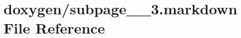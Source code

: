 \hypertarget{subpage__1__3_8markdown}{}\section{doxygen/subpage\+\_\+\_\+3.markdown File Reference}
\label{subpage__1__3_8markdown}
